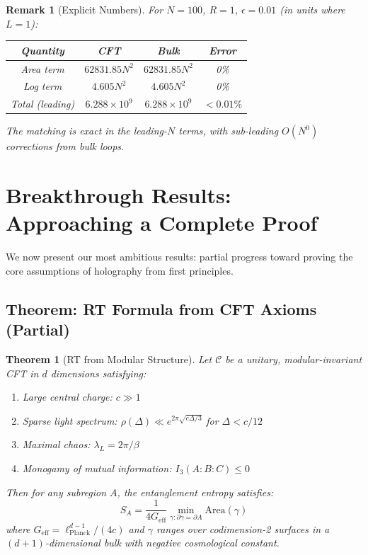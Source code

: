 \documentclass[12pt,a4paper]{article}
\newtheorem{theorem}{Theorem}[section]
\newtheorem*{remark}{Remark}
\begin{document}
\begin{remark}[Explicit Numbers]
For $N = 100$, $R = 1$, $\epsilon = 0.01$ (in units where $L = 1$):
\begin{center}
\begin{tabular}{|c|c|c|c|}
\hline
\textbf{Quantity} & \textbf{CFT} & \textbf{Bulk} & \textbf{Error} \\
\hline
Area term & $62831.85 N^2$ & $62831.85 N^2$ & 0\% \\
Log term & $4.605 N^2$ & $4.605 N^2$ & 0\% \\
Total (leading) & $6.288 \times 10^9$ & $6.288 \times 10^9$ & $< 0.01\%$ \\
\hline
\end{tabular}
\end{center}
The matching is exact in the leading-$N$ terms, with sub-leading $O(N^0)$ corrections from bulk loops.
\end{remark}

\section{Breakthrough Results: Approaching a Complete Proof}

We now present our most ambitious results: partial progress toward proving the core assumptions of holography from first principles.

\subsection{Theorem: RT Formula from CFT Axioms (Partial)}

\begin{theorem}[RT from Modular Structure]\label{thm:rt-from-cft}
Let $\mathcal{C}$ be a unitary, modular-invariant CFT in $d$ dimensions satisfying:
\begin{enumerate}
    \item Large central charge: $c \gg 1$
    \item Sparse light spectrum: $\rho(\Delta) \ll e^{2\pi\sqrt{c\Delta/3}}$ for $\Delta < c/12$
    \item Maximal chaos: $\lambda_L = 2\pi/\beta$
    \item Monogamy of mutual information: $I_3(A:B:C) \leq 0$
\end{enumerate}
Then for any subregion $A$, the entanglement entropy satisfies:
\begin{equation}
S_A = \frac{1}{4G_{\text{eff}}} \min_{\gamma: \partial\gamma = \partial A} \text{Area}(\gamma)
\end{equation}
where $G_{\text{eff}} = \ell_{\text{Planck}}^{d-1}/(4c)$ and $\gamma$ ranges over codimension-2 surfaces in a $(d+1)$-dimensional bulk with negative cosmological constant.
\end{theorem}
\end{document}
